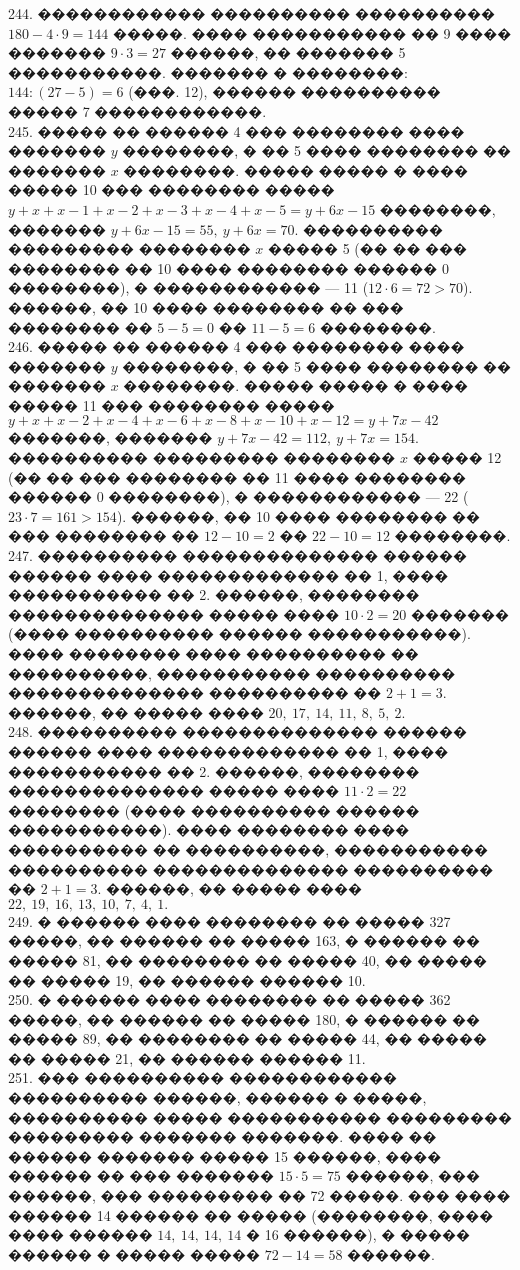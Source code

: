 \documentclass[12pt]{article}
\begin{document}
244. ������������ ���������� ���������� $180-4\cdot9=144$ �����. ���� ����������� �� 9 ���� ������� $9\cdot3=27$ ������, �� ������� 5 �����������. ������� � ��������: $144:(27-5)=6$ (���. 12), ������ ���������� ����� 7 ������������.\\
245. ����� �� ������ 4 ��� �������� ���� ������� $y$ ��������, � �� 5 ���� �������� �� ������� $x$ ��������. ����� ����� � ���� ����� 10 ��� �������� ����� $y+x+x-1+x-2+x-3+x-4+x-5=y+6x-15$ ��������, ������� $y+6x-15=55,\ y+6x=70.$ ���������� ��������� �������� $x$ ����� 5 (�� �� ��� �������� �� 10 ���� �������� ������ 0 ��������), � ������������ --- 11 ($12\cdot6=72>70$). ������, �� 10 ���� �������� �� ��� �������� �� $5-5=0$ �� $11-5=6$ ��������.\\
246. ����� �� ������ 4 ��� �������� ���� ������� $y$ ��������, � �� 5 ���� �������� �� ������� $x$ ��������. ����� ����� � ���� ����� 11 ��� �������� ����� $y+x+x-2+x-4+x-6+x-8+x-10+x-12=y+7x-42$ �������, ������� $y+7x-42=112,\ y+7x=154.$ ���������� ��������� �������� $x$ ����� 12 (�� �� ��� �������� �� 11 ���� �������� ������ 0 ��������), � ������������ --- 22 ($23\cdot7=161>154$). ������, �� 10 ���� �������� �� ��� �������� �� $12-10=2$ �� $22-10=12$ ��������.\\
247. ���������� �������������� ������ ������ ���� ������������� �� 1, ���� ����������� �� 2. ������, �������� �������������� ����� ���� $10\cdot2=20$ ������� (���� ���������� ������ �����������). ���� �������� ���� ���������� �� ����������, ����������� ���������� �������������� ���������� �� $2+1=3.$ ������, �� ����� ���� $20,\ 17,\ 14,\ 11,\ 8,\ 5,\ 2.$\\
248. ���������� �������������� ������ ������ ���� ������������� �� 1, ���� ����������� �� 2. ������, �������� �������������� ����� ���� $11\cdot2=22$ �������� (���� ���������� ������ �����������). ���� �������� ���� ���������� �� ����������, ����������� ���������� �������������� ���������� �� $2+1=3.$ ������, �� ����� ���� $22,\ 19,\ 16,\ 13,\ 10,\ 7,\ 4,\ 1.$\\
249. � ������ ���� �������� �� ����� 327 �����, �� ������ �� ����� 163, � ������ �� ����� 81, �� �������� �� ����� 40, �� ����� �� ����� 19, �� ������ ������ 10.\\
250. � ������ ���� �������� �� ����� 362 �����, �� ������ �� ����� 180, � ������ �� ����� 89, �� �������� �� ����� 44, �� ����� �� ����� 21, �� ������ ������ 11.\\
251. ��� ���������� ������������ ���������� ������, ������ � �����, ���������� ����� ����������� ��������� ��������� ������� �������. ���� �� ������ ������� ����� 15 ������, ���� ������ �� ��� ������� $15\cdot5=75$ ������, ��� ������, ��� ��������� �� 72 �����. ��� ���� ������ 14 ������ �� ����� (��������, ���� ���� ������ $14,\ 14,\ 14,\ 14$ � 16 ������), � ����� ������ � ����� ����� $72-14=58$ ������.\\
\end{document}

